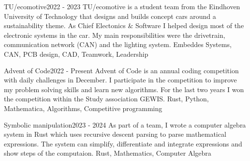 %
%
%


\begin{projects}
	\project
	{TU/ecomotive}{2022 - 2023}
	{}
    {TU/ecomotive is a student team from the Eindhoven University of Technology that designs and builds concept cars around a sustainability theme. As Chief Electonics \& Software I helped design most of the electronic systems in the car. My main responsibilities were the drivetrain, communication network (CAN) and the lighting system.}
    {Embeddes Systems, CAN, PCB design, CAD, Teamwork, Leadership}

	\project
	{Advent of Code}{2022 - Present}
    { }
    {Advent of Code is an annual coding competition with daily challenges in December. I participate in the competition to improve my problem solving skills and learn new algorithms. For the last two years I won the competition within the Study association GEWIS.}
	{Rust, Python, Mathematica, Algorithms, Competitive programming}

	\project
	{Symbolic manipulation}{2023 - 2024}
    {}
    {As part of a team, I wrote a computer algebra system in Rust which uses recursive descent parsing to parse mathematical expressions. The system can simplify, differentiate and integrate expressions and show steps of the computaion.}
	{Rust, Mathematics, Computer Algebra}
\end{projects}
